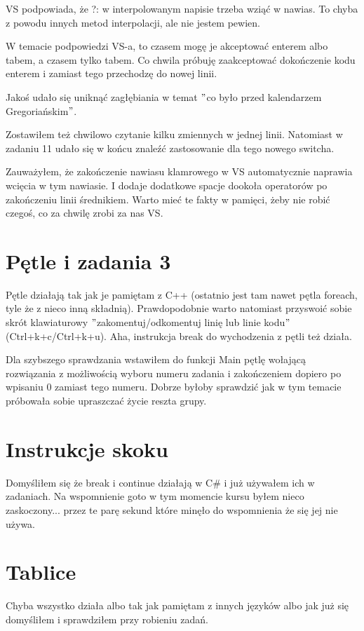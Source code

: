 \documentclass[10pt]{article}
\begin{document}
VS podpowiada, że ?: w interpolowanym napisie trzeba wziąć w nawias. To chyba z powodu innych metod interpolacji, ale nie jestem pewien.

W temacie podpowiedzi VS-a, to czasem mogę je akceptować enterem albo tabem, a czasem tylko tabem. Co chwila próbuję zaakceptować dokończenie kodu enterem i zamiast tego przechodzę do nowej linii.

Jakoś udało się uniknąć zagłębiania w temat $"$co było przed kalendarzem Gregoriańskim$"$.

Zostawiłem też chwilowo czytanie kilku zmiennych w jednej linii. Natomiast w zadaniu 11 udało się w końcu znaleźć zastosowanie dla tego nowego switcha.

Zauważyłem, że zakończenie nawiasu klamrowego w VS automatycznie naprawia wcięcia w tym nawiasie. I dodaje dodatkowe spacje dookoła operatorów po zakończeniu linii średnikiem. Warto mieć te fakty w pamięci, żeby nie robić czegoś, co za chwilę zrobi za nas VS.

\section{Pętle i zadania 3}
Pętle działają tak jak je pamiętam z C++ (ostatnio jest tam nawet pętla foreach, tyle że z nieco inną składnią). Prawdopodobnie warto natomiast przyswoić sobie skrót klawiaturowy $"$zakomentuj/odkomentuj linię lub linie kodu$"$ (Ctrl+k+c/Ctrl+k+u). Aha, instrukcja break do wychodzenia z pętli też działa.

Dla szybszego sprawdzania wstawiłem do funkcji Main pętlę wołającą rozwiązania z możliwością wyboru numeru zadania i zakończeniem dopiero po wpisaniu 0 zamiast tego numeru. Dobrze byłoby sprawdzić jak w tym temacie próbowała sobie upraszczać życie reszta grupy.

\section{Instrukcje skoku}
Domyśliłem się że break i continue działają w C\# i już używałem ich w zadaniach. Na wspomnienie goto w tym momencie kursu byłem nieco zaskoczony... przez te parę sekund które minęło do wspomnienia że się jej nie używa.

\section{Tablice}
Chyba wszystko działa albo tak jak pamiętam z innych języków albo jak już się domyśliłem i sprawdziłem przy robieniu zadań.
\end{document}
